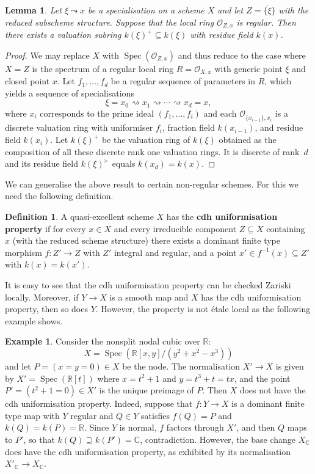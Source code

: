 \documentclass[a4paper,twoside,11pt,reqno]{amsart}
\renewcommand{\mathbb}{\mathds}
\newcommand{\cO}{{\mathcal O}}
\DeclareMathOperator{\Spec}{Spec}
\newtheorem{lem}[thm]{Lemma}
\theoremstyle{definition}
\newtheorem{defi}[thm]{Definition}
\newtheorem{ex}[thm]{Example}
\numberwithin{equation}{subsection}
\begin{document}
\begin{lem} \label{lem:valuation-on-regular}
    Let $\xi\leadsto x$ be a specialisation on a scheme $X$ and let $Z=\overline{\{\xi}\}$ with the reduced subscheme structure. Suppose that the local ring $\cO_{Z,x}$ is regular. Then there exists a valuation subring $k(\xi)^+\subseteq k(\xi)$ with residue field $k(x)$.
\end{lem}

\begin{proof}
We may replace $X$ with $\Spec(\cO_{Z,x})$ and thus reduce to the case where $X=Z$ is the spectrum of a regular local ring $R=\cO_{X,x}$ with generic point $\xi$ and closed point $x$. Let $f_1, \ldots, f_d$ be a regular sequence of parameters in $R$, which yields a sequence of specialisations
\[
 \xi = x_0 \rightsquigarrow x_1 \rightsquigarrow \cdots \rightsquigarrow x_d = x,
\]
where $x_i$ corresponds to the prime ideal $(f_1, \dots, f_i)$ and each $\cO_{\overline{\{x_{i-1}\}},x_i}$ is a discrete valuation ring with uniformiser $f_i$, fraction field $k(x_{i-1})$, and residue field $k(x_i)$.
Let $k(\xi)^+$ be the valuation ring of $k(\xi)$ obtained as the composition of all these discrete rank one valuation rings.
It is discrete of rank~$d$ and its residue field $k(\xi)^\succ$ equals $k(x_d) = k(x)$.
\end{proof}

We can generalise the above result to certain non-regular schemes. For this we need the following definition.

\begin{defi} \label{def:cdh-unif}
    A quasi-excellent scheme $X$ has the {\bf cdh uniformisation property} if for every $x\in X$ and every irreducible component $Z\subseteq X$ containing $x$ (with the reduced scheme structure) there exists a dominant finite type morphism $f\colon Z'\to Z$ with $Z'$ integral and regular, and a point $x'\in f^{-1}(x)\subseteq Z'$ with $k(x)=k(x')$.
\end{defi}

It is easy to see that the cdh uniformisation property can be checked Zariski locally.
Moreover, if $Y\to X$ is a smooth map and $X$ has the cdh uniformisation property, then so does $Y$.
However, the property is not étale local as the following example shows.

\begin{ex} \label{ex:nodal-curve-noncdh}
    Consider the nonsplit nodal cubic over $\mathbb{R}$:
    \[
        X = \Spec(\mathbb{R}[x,y]/(y^2 + x^2 - x^3))
    \]
    and let $P=(x=y=0)\in X$ be the node. The normalisation $X'\to X$ is given by $X'=\Spec(\mathbb{R}[t])$ where $x=t^2+1$ and $y=t^3+t=tx$, and the point $P'=(t^2+1=0)\in X'$ is the unique preimage of $P$. Then $X$ does not have the cdh uniformisation property. Indeed, suppose that $f\colon Y\to X$ is a dominant finite type map with $Y$ regular and $Q\in Y$ satisfies $f(Q)=P$ and $k(Q)=k(P)=\mathbb{R}$. Since $Y$ is normal, $f$ factors through $X'$, and then $Q$ maps to $P'$, so that $k(Q)\supseteq k(P')=\mathbb{C}$, contradiction. However, the base change $X_\mathbb{C}$ does have the cdh uniformisation property, as exhibited by its normalisation $X'_\mathbb{C}\to X_\mathbb{C}$.
\end{ex}
\end{document}
